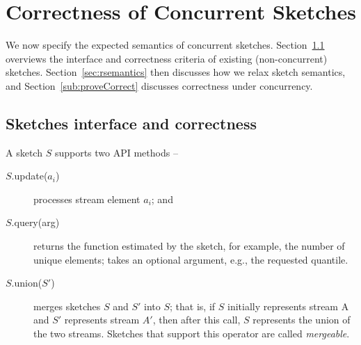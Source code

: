 \section{Correctness of Concurrent Sketches}
\label{sec:concurrentSketches}


We now specify the expected semantics of concurrent sketches. 
Section~\ref{sec:semantics} overviews the interface and correctness criteria of existing (non-concurrent) sketches. 
Section~\ref{sec:rsemantics} then discusses how we relax sketch semantics,
and Section~\ref{sub:proveCorrect} discusses correctness under concurrency.


\subsection{Sketches interface and correctness}
\label{sec:semantics}


A sketch $S$ supports two API methods -- 
\begin{description}
\item[$S$.update($a_i$)] processes stream element $a_i$; and 
\item[$S$.query(arg)] returns the function estimated by the sketch, for example, the number of unique elements; 
 takes an optional argument, e.g., the requested quantile.
 \item[$S$.union($S'$)] merges sketches $S$ and $S'$ into $S$; that is, if $S$ initially represents stream A and $S'$ 
 represents stream $A'$, then after this call, $S$ represents the union of the two streams. 
 Sketches that support this operator are called \emph{mergeable}.
\end{description}

